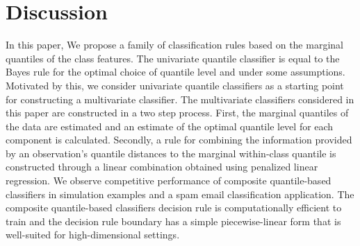 
\section{Discussion}
\label{sec:discussion}

In this paper, We propose a family of classification rules based on the marginal
quantiles of the class features.  The univariate quantile classifier is equal to
the Bayes rule for the optimal choice of quantile level and under some
assumptions.  Motivated by this, we consider univariate quantile classifiers as
a starting point for constructing a multivariate classifier.  The multivariate
classifiers considered in this paper are constructed in a two step process.
First, the marginal quantiles of the data are estimated and an estimate of the
optimal quantile level for each component is calculated.  Secondly, a rule for
combining the information provided by an observation's quantile distances to the
marginal within-class quantile is constructed through a linear combination
obtained using penalized linear regression.  We observe competitive performance
of composite quantile-based classifiers in simulation examples and a spam email
classification application.  The composite quantile-based classifiers decision
rule is computationally efficient to train and the decision rule boundary has a
simple piecewise-linear form that is well-suited for high-dimensional settings.




